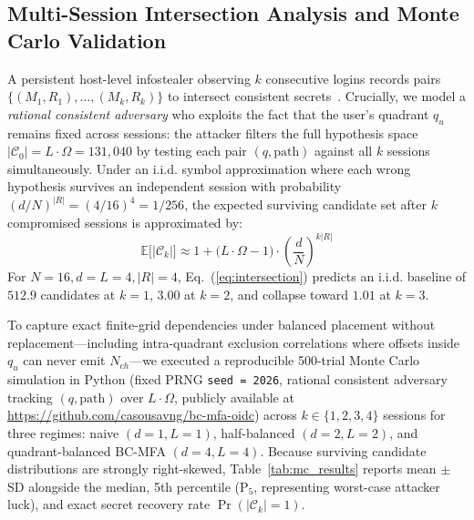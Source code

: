 \subsection{Multi-Session Intersection Analysis and Monte Carlo Validation}
A persistent host-level infostealer observing $k$ consecutive logins records pairs $\{(M_1, R_1), \dots, (M_k, R_k)\}$ to intersect consistent secrets~\cite{binbeshr2025challenge}. Crucially, we model a \emph{rational consistent adversary} who exploits the fact that the user's quadrant $q_u$ remains fixed across sessions: the attacker filters the full hypothesis space $|\mathcal{C}_0| = L \cdot \Omega = 131{,}040$ by testing each pair $(q, \text{path})$ against all $k$ sessions simultaneously. Under an i.i.d. symbol approximation where each wrong hypothesis survives an independent session with probability $(d/N)^{|R|} = (4/16)^4 = 1/256$, the expected surviving candidate set after $k$ compromised sessions is approximated by:
\begin{equation}
\mathbb{E}\big[|\mathcal{C}_k|\big] \approx 1 + \big(L \cdot \Omega - 1\big) \cdot \left(\frac{d}{N}\right)^{k|R|}
\label{eq:intersection}
\end{equation}
For $N = 16, d = L = 4, |R| = 4$, Eq.~(\ref{eq:intersection}) predicts an i.i.d. baseline of $512.9$ candidates at $k = 1$, $3.00$ at $k = 2$, and collapse toward $1.01$ at $k = 3$.

To capture exact finite-grid dependencies under balanced placement without replacement—including intra-quadrant exclusion correlations where offsets inside $q_u$ can never emit $N_{ch}$—we executed a reproducible 500-trial Monte Carlo simulation in Python (fixed PRNG \texttt{seed = 2026}, rational consistent adversary tracking $(q, \text{path})$ over $L \cdot \Omega$, publicly available at \url{https://github.com/casousavng/bc-mfa-oidc}) across $k \in \{1, 2, 3, 4\}$ sessions for three regimes: naive $(d=1, L=1)$, half-balanced $(d=2, L=2)$, and quadrant-balanced BC-MFA $(d=4, L=4)$. Because surviving candidate distributions are strongly right-skewed, Table~\ref{tab:mc_results} reports mean $\pm$ SD alongside the median, 5th percentile ($\text{P}_5$, representing worst-case attacker luck), and exact secret recovery rate $\Pr(|\mathcal{C}_k| = 1)$.

